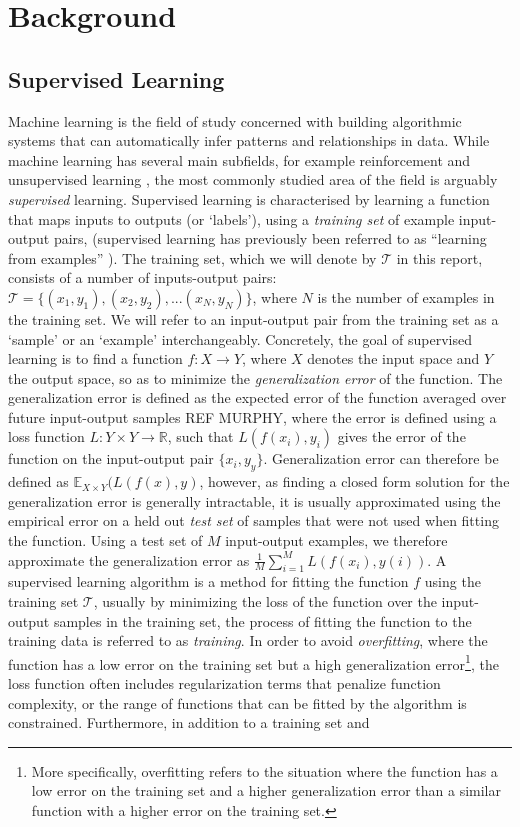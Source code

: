 \chapter{Background}

\section{Supervised Learning}
Machine learning is the field of study concerned with building algorithmic systems that can automatically infer patterns and relationships in data. While machine learning has several main subfields, for example reinforcement \cite{sutton1998introduction} and unsupervised learning \cite{hastie2009unsupervised}, the most commonly studied area of the field is arguably \textit{supervised} learning. Supervised learning is characterised by learning a function that maps inputs to outputs (or `labels'), using a \textit{training set} of example input-output pairs, (supervised learning has previously been referred to as ``learning from examples'' \cite{cohn1994improving}). The training set, which we will denote by $\mathcal{T}$ in this report, consists of a number of inputs-output pairs: $\mathcal{T} = \{(x_1,y_1),(x_2,y_2),...(x_N,y_N)\}$, where $N$ is the number of examples in the training set. We will refer to an input-output pair from the training set as a `sample' or an `example' interchangeably. Concretely, the goal of supervised learning is to find a function $f : X \rightarrow Y$, where $X$ denotes the input space and $Y$ the output space, so as to minimize the \textit{generalization error} of the function. The generalization error is defined as the expected error of the function averaged over future input-output samples REF MURPHY, where the error is defined using a loss function $L:Y \times Y \rightarrow \mathbb{R}$, such that $L(f(x_i),y_i)$ gives the error of the function on the input-output pair $\{x_i,y_y\}$. Generalization error can therefore be defined as $\mathbb{E}_{X\times Y}(L(f(x),y)$, however, as finding a closed form solution for the generalization error is generally intractable, it is usually approximated using the empirical error on a held out \textit{test set} of samples that were not used when fitting the function. Using a test set of $M$ input-output examples, we therefore approximate the generalization error as $\frac{1}{M}\sum_{i=1}^{M} L(f(x_i),y(i))$. A supervised learning algorithm is a method for fitting the function $f$ using the training set $\mathcal{T}$, usually by minimizing the loss of the function over the input-output samples in the training set, the process of fitting the function to the training data is referred to as \textit{training}. In order to avoid \textit{overfitting}, where the function has a low error on the training set but a high generalization error\footnote{More specifically, overfitting refers to the situation where the function has a low error on the training set and a higher generalization error than a similar function with a higher error on the training set.}, the loss function often includes regularization terms that penalize function complexity, or the range of functions that can be fitted by the algorithm is constrained. Furthermore, in addition to a training set and 